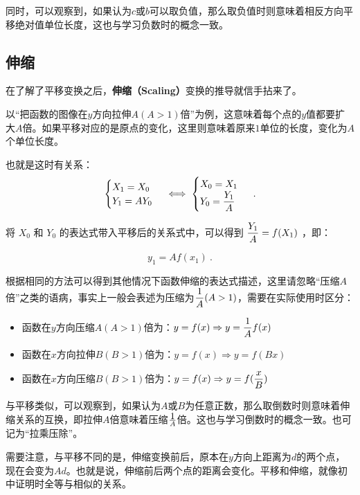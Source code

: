 同时，可以观察到，如果认为$c$或$b$可以取负值，那么取负值时则意味着相反方向平移绝对值单位长度，这也与学习负数时的概念一致。

\subsection{伸缩}\label{sub_FunTra_2}

在了解了平移变换之后，\textbf{伸缩（Scaling）}变换的推导就信手拈来了。

以“把函数的图像在$y$方向拉伸$A(A>1)$倍”为例，这意味着每个点的$y$值都要扩大$A$倍。如果平移对应的是原点的变化，这里则意味着原来$1$单位的长度，变化为$A$个单位长度。

也就是这时有关系：
\begin{equation}
\begin{cases}
X_1=X_0\\
Y_1=AY_0
\end{cases}\iff
\begin{cases}
X_0=X_1\\
\displaystyle Y_0={Y_1\over A}
\end{cases}~.
\end{equation}

将  $X_0$  和  $Y_0$  的表达式带入平移后的关系式中，可以得到  $\displaystyle{Y_1\over A} = f(X_1 )$ ，即：

\begin{equation}
y_1=Af(x_1)~.
\end{equation}

根据相同的方法可以得到其他情况下函数伸缩的表达式描述，这里请忽略“压缩$A$倍”之类的语病，事实上一般会表述为压缩为$\displaystyle{1\over A}(A>1)$，需要在实际使用时区分：

\begin{itemize}
\item 函数在$y$方向压缩$A(A>1)$倍为：$\displaystyle y=f(x)\Rightarrow y={1\over A}f(x)$
\item 函数在$x$方向拉伸$B(B>1)$倍为：$y=f(x)\Rightarrow y=f(Bx)$
\item 函数在$x$方向压缩$B(B>1)$倍为：$\displaystyle y=f(x)\Rightarrow y=f({x\over B})$
\end{itemize}

与平移类似，可以观察到，如果认为$A$或$B$为任意正数，那么取倒数时则意味着伸缩关系的互换，即拉伸$A$倍意味着压缩$\displaystyle 1\over A$倍。这也与学习倒数时的概念一致。也可记为“拉乘压除”。

需要注意，与平移不同的是，伸缩变换前后，原本在$y$方向上距离为$d$的两个点，现在会变为$Ad$。也就是说，伸缩前后两个点的距离会变化。平移和伸缩，就像初中证明时全等与相似的关系。

